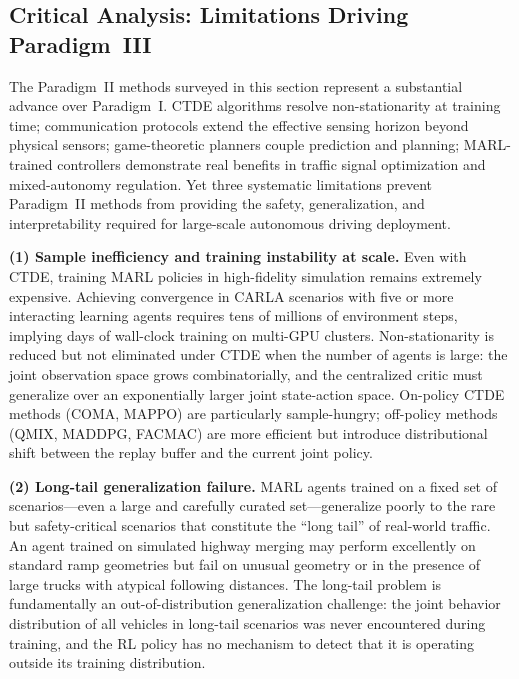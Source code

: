 \documentclass[12pt, a4paper]{article}
\begin{document}
\subsection{Critical Analysis: Limitations Driving Paradigm~III}
\label{sec:paradigm2_limits}

The Paradigm~II methods surveyed in this section represent a substantial advance
over Paradigm~I.  CTDE algorithms resolve non-stationarity at training time;
communication protocols extend the effective sensing horizon beyond physical
sensors; game-theoretic planners couple prediction and planning;
MARL-trained controllers demonstrate real benefits in traffic signal optimization
and mixed-autonomy regulation.  Yet three systematic limitations prevent
Paradigm~II methods from providing the safety, generalization, and
interpretability required for large-scale autonomous driving deployment.

\textbf{(1) Sample inefficiency and training instability at scale.}
Even with CTDE, training MARL policies in high-fidelity simulation remains
extremely expensive.  Achieving convergence in CARLA scenarios with five or
more interacting learning agents requires tens of millions of environment steps,
implying days of wall-clock training on multi-GPU clusters.  Non-stationarity
is reduced but not eliminated under CTDE when the number of agents is large:
the joint observation space grows combinatorially, and the centralized critic
must generalize over an exponentially larger joint state-action space.
On-policy CTDE methods (COMA, MAPPO) are particularly sample-hungry; off-policy
methods (QMIX, MADDPG, FACMAC) are more efficient but introduce distributional
shift between the replay buffer and the current joint policy.

\textbf{(2) Long-tail generalization failure.}
MARL agents trained on a fixed set of scenarios---even a large and carefully
curated set---generalize poorly to the rare but safety-critical scenarios
that constitute the ``long tail'' of real-world traffic.  An agent trained on
simulated highway merging may perform excellently on standard ramp geometries
but fail on unusual geometry or in the presence of large trucks with atypical
following distances.  The long-tail problem is fundamentally an out-of-distribution
generalization challenge: the joint behavior distribution of all vehicles in
long-tail scenarios was never encountered during training, and the RL policy
has no mechanism to detect that it is operating outside its training distribution.
\end{document}
